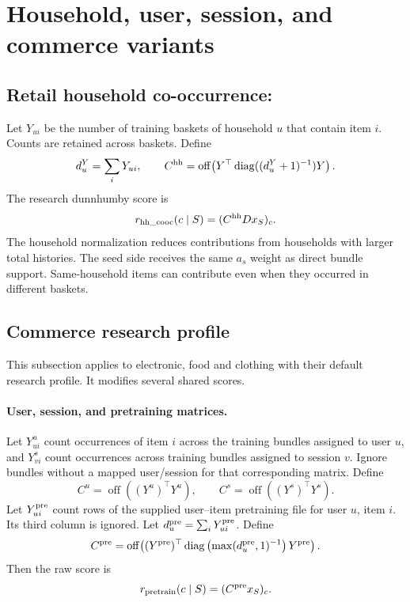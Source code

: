 \documentclass[11pt,a4paper]{article}
\newcommand{\off}{\operatorname{off}}
\DeclareRobustCommand{\key}[1]{\texttt{\detokenize{#1}}}
\begin{document}
\section{Household, user, session, and commerce variants}

\subsection{Retail household co-occurrence: \key{hh_cooc}}
Let $Y_{ui}$ be the number of training baskets of household $u$ that contain
item $i$. Counts are retained across baskets. Define
\[
 d_u^Y=\sum_iY_{ui},\qquad
 C^{\rm hh}=\off\!\left(Y^\top\operatorname{diag}((d_u^Y+1)^{-1})Y\right).
\]
The research dunnhumby score is
\begin{equation}
 r_{\rm hh\_cooc}(c\mid S)=(C^{\rm hh}Dx_S)_c.
\end{equation}
The household normalization reduces contributions from households with larger
total histories. The seed side receives the same $a_s$ weight as direct
bundle support. Same-household items can contribute even when they occurred
in different baskets.

\subsection{Commerce research profile}\label{sec:commerce}
This subsection applies to electronic, food and clothing with their default
research profile. It modifies several shared scores.

\paragraph{User, session, and pretraining matrices.}
Let $Y^u_{ui}$ count occurrences of item $i$ across the training bundles
assigned to user $u$, and $Y^s_{vi}$ count occurrences across training bundles
assigned to session $v$. Ignore bundles without a mapped user/session for
that corresponding matrix. Define
\[
 C^u=\off((Y^u)^\top Y^u),\qquad C^s=\off((Y^s)^\top Y^s).
\]
Let $Y^{\rm pre}_{ui}$ count rows of the supplied user--item pretraining file
for user $u$, item $i$. Its third column is ignored. Let
$d_u^{\rm pre}=\sum_iY^{\rm pre}_{ui}$. Define
\[
 C^{\rm pre}=\off\!\left((Y^{\rm pre})^\top
 \operatorname{diag}\left(\max(d_u^{\rm pre},1)^{-1}\right)Y^{\rm pre}\right).
\]
Then the raw \key{pretrain} score is
\begin{equation}
 r_{\rm pretrain}(c\mid S)=(C^{\rm pre}x_S)_c.
\end{equation}
\end{document}
